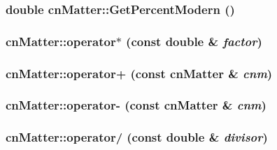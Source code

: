 \label{classcn_matter_ab6bf079d174644a74cc013717cea0912}
\hypertarget{classcn_matter_ae01f1fa8c17a4bd64de34cfd6a180dd6}{
\subsubsection[{GetPercentModern}]{\setlength{\rightskip}{0pt plus 5cm}double cnMatter::GetPercentModern ()}}
\label{classcn_matter_ae01f1fa8c17a4bd64de34cfd6a180dd6}
\hypertarget{classcn_matter_a97a9f46efac3c82b0d33c1e74e23640c}{
\subsubsection[{operator$\ast$}]{ cnMatter::operator$\ast$ (const double \& {\em factor})}}
\label{classcn_matter_a97a9f46efac3c82b0d33c1e74e23640c}
\hypertarget{classcn_matter_afaf7d3a8759467c407f3399097f449de}{
\subsubsection[{operator+}]{ cnMatter::operator+ (const {\bf cnMatter} \& {\em cnm})}}
\label{classcn_matter_afaf7d3a8759467c407f3399097f449de}
\hypertarget{classcn_matter_ae0417a0adb039f71f75d810d80cce2b4}{
\subsubsection[{operator-\/}]{ cnMatter::operator-\/ (const {\bf cnMatter} \& {\em cnm})}}
\label{classcn_matter_ae0417a0adb039f71f75d810d80cce2b4}
\hypertarget{classcn_matter_a251b67b6dcfc44453c2806890d38930f}{
\subsubsection[{operator/}]{ cnMatter::operator/ (const double \& {\em divisor})}}
